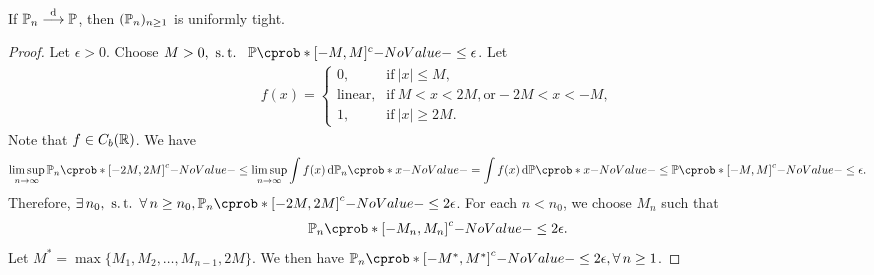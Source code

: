 \documentclass[12pt]{article}
\begin{document}
%
\begin{Lemma}\label{wk9:lem:convd_implies_uniform_tightness}
If $\P_n \convd \P$, then $(\P_n)_{n \geq 1}$ is uniformly tight.
\end{Lemma}
%
\begin{proof}
Let $\epsilon > 0$. Choose $M > 0, \ \st\ \P({[-M, M]^c}) \leq \epsilon$.
Let
\begin{align*}
f(x) = 
\begin{cases}
    0, & \text{if}\ |x| \leq M, \\
    \text{linear}, & \text{if}\ M < x < 2M, \text{or} -2M < x < -M, \\
    1, & \text{if}\ |x| \geq 2M.
\end{cases}
\end{align*}
Note that $f \in C_b(\mathbb{R})$. We have
\begin{align*}
\limsup_{n \to \infty} \P_n(\left[ -2M, 2M \right]^c)
\leq \limsup_{n \to \infty} \int f(x) \ud\P_n(x)
= \int f(x) \ud\P(x) 
\leq \P(\left[ -M, M \right]^c) 
\leq \epsilon.
\end{align*}
Therefore, $\exists n_0, \ \st \forall n \geq n_0, \P_n(\left[ -2M, 2M \right]^c) \leq 2\epsilon$.
For each $n < n_0$, we choose $M_n$ such that
\begin{align*}
\P_n(\left[ -M_n, M_n \right]^c) \leq 2\epsilon.
\end{align*}
Let $M^* = \max \{M_1, M_2, \ldots, M_{n-1}, 2M\}$. We then have $\P_n(\left[ -M^*, M^* \right]^c) \leq 2\epsilon, \forall n \geq 1$.
\end{proof}


%
%
%

\end{document}
